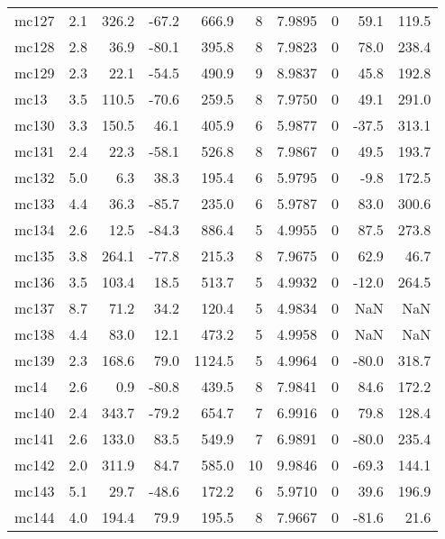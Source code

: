 \documentclass{article}
\begin{document}
\begin{longtable}{lrrrrrrrrr}
 mc127 &  2.1 &  326.2 & -67.2 &   666.9 &   8 &   7.9895 &       0 &     59.1 &     119.5 \\
 mc128 &  2.8 &   36.9 & -80.1 &   395.8 &   8 &   7.9823 &       0 &     78.0 &     238.4 \\
 mc129 &  2.3 &   22.1 & -54.5 &   490.9 &   9 &   8.9837 &       0 &     45.8 &     192.8 \\
  mc13 &  3.5 &  110.5 & -70.6 &   259.5 &   8 &   7.9750 &       0 &     49.1 &     291.0 \\
 mc130 &  3.3 &  150.5 &  46.1 &   405.9 &   6 &   5.9877 &       0 &    -37.5 &     313.1 \\
 mc131 &  2.4 &   22.3 & -58.1 &   526.8 &   8 &   7.9867 &       0 &     49.5 &     193.7 \\
 mc132 &  5.0 &    6.3 &  38.3 &   195.4 &   6 &   5.9795 &       0 &     -9.8 &     172.5 \\
 mc133 &  4.4 &   36.3 & -85.7 &   235.0 &   6 &   5.9787 &       0 &     83.0 &     300.6 \\
 mc134 &  2.6 &   12.5 & -84.3 &   886.4 &   5 &   4.9955 &       0 &     87.5 &     273.8 \\
 mc135 &  3.8 &  264.1 & -77.8 &   215.3 &   8 &   7.9675 &       0 &     62.9 &      46.7 \\
 mc136 &  3.5 &  103.4 &  18.5 &   513.7 &   5 &   4.9932 &       0 &    -12.0 &     264.5 \\
 mc137 &  8.7 &   71.2 &  34.2 &   120.4 &   5 &   4.9834 &       0 &      NaN &       NaN \\
 mc138 &  4.4 &   83.0 &  12.1 &   473.2 &   5 &   4.9958 &       0 &      NaN &       NaN \\
 mc139 &  2.3 &  168.6 &  79.0 &  1124.5 &   5 &   4.9964 &       0 &    -80.0 &     318.7 \\
  mc14 &  2.6 &    0.9 & -80.8 &   439.5 &   8 &   7.9841 &       0 &     84.6 &     172.2 \\
 mc140 &  2.4 &  343.7 & -79.2 &   654.7 &   7 &   6.9916 &       0 &     79.8 &     128.4 \\
 mc141 &  2.6 &  133.0 &  83.5 &   549.9 &   7 &   6.9891 &       0 &    -80.0 &     235.4 \\
 mc142 &  2.0 &  311.9 &  84.7 &   585.0 &  10 &   9.9846 &       0 &    -69.3 &     144.1 \\
 mc143 &  5.1 &   29.7 & -48.6 &   172.2 &   6 &   5.9710 &       0 &     39.6 &     196.9 \\
 mc144 &  4.0 &  194.4 &  79.9 &   195.5 &   8 &   7.9667 &       0 &    -81.6 &      21.6 \\

\end{longtable}
\end{document}
